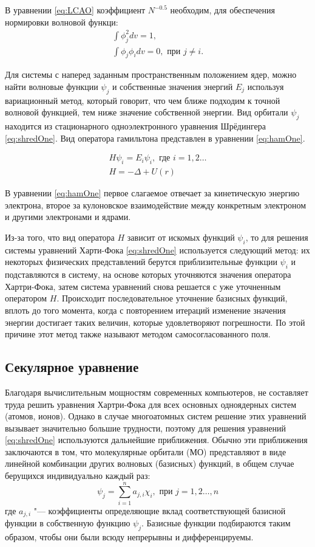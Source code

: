 В уравнении \ref{eq:LCAO} коэффициент $N^{-0.5}$ необходим, для обеспечения нормировки волновой функци:
\begin{eqnarray}
\label{eq:normBasis}
\int\phi^2_jdv=1,\\
\label{eq:ortogBasis}
\int\phi_j\phi_idv=0, \text{ при }j\ne i.
\end{eqnarray}

Для системы с наперед заданным пространственным положением ядер, можно найти волновые функции $\psi_j$ и собственные значения энергий $E_j$ используя вариационный метод, который говорит, что чем ближе подходим к точной волновой функцией, тем ниже значение собственной энергии. 
Вид орбитали $\psi_j$ находится из стационарного одноэлектронного уравнения Шрёдингера \ref{eq:shredOne}. 
Вид оператора гамильтона представлен в уравнении \ref{eq:hamOne}.

\begin{eqnarray}
\label{eq:shredOne}
H\psi_i=E_i\psi_i,\text{ где }i=1,2\dots\\
\label{eq:hamOne}
H=-\Delta+U(r)
\end{eqnarray}

В уравнении \ref{eq:hamOne} первое слагаемое отвечает за кинетическую энергию электрона, второе за кулоновское взаимодействие между конкретным электроном и другими электронами и ядрами.

Из-за того, что вид оператора $H$ зависит от искомых функций $\psi_i$, то для решения системы уравнений Харти-Фока \ref{eq:shredOne} используется следующий метод: их некоторых физических представлений берутся приблизительные функции $\psi_i$ и подставляются в систему, на основе которых уточняются значения оператора Хартри-Фока, затем система уравнений снова решается с уже уточненным оператором $H$. 
Происходит последовательное уточнение базисных функций, вплоть до того момента, когда с повторением итераций изменение значения энергии достигает таких величин, которые удовлетворяют погрешности. 
По этой причине этот метод также называют методом самосогласованного поля.

\subsection{Секулярное уравнение}

Благодаря вычислительным мощностям современных компьютеров, не составляет труда решить уравнения Хартри-Фока для всех основных одноядерных систем (атомов, ионов). 
Однако в случае многоатомных систем решение этих уравнений вызывает значительно большие трудности, поэтому для решения уравнений \ref{eq:shredOne} используются дальнейшие приближения. 
Обычно эти приближения заключаются в том, что молекулярные орбитали (МО) представляют в виде линейной комбинации других волновых (базисных) функций, в общем случае берущихся индивидуально каждый раз:
\begin{equation}
\label{eq:LCAOOne}
\psi_j=\sum_{i=1}^{n}a_{j,i}\chi_i, \text{ при } j=1,2 \dots, n
\end{equation}
где $a_{j,i}$ "--- коэффициенты определяющие вклад соответствующей базисной функции в собственную функцию $\psi_j$. 
Базисные функции подбираются таким образом, чтобы они были всюду непрерывны и дифференцируемы.

